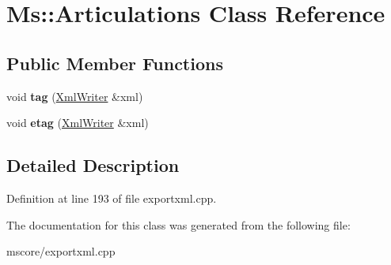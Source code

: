 \hypertarget{class_ms_1_1_articulations}{}\section{Ms\+:\+:Articulations Class Reference}
\label{class_ms_1_1_articulations}
\subsection*{Public Member Functions}
\begin{DoxyCompactItemize}
\item 
\mbox{\label{class_ms_1_1_articulations_aac575fc24d475e5c6cd4b48ddeca65a4}} 
void {\bfseries tag} (\hyperlink{class_ms_1_1_xml_writer}{Xml\+Writer} \&xml)
\item 
\mbox{\label{class_ms_1_1_articulations_a271129dcdc4b267b769b39e15f0754f8}} 
void {\bfseries etag} (\hyperlink{class_ms_1_1_xml_writer}{Xml\+Writer} \&xml)
\end{DoxyCompactItemize}


\subsection{Detailed Description}


Definition at line 193 of file exportxml.\+cpp.



The documentation for this class was generated from the following file\+:\begin{DoxyCompactItemize}
\item 
mscore/exportxml.\+cpp\end{DoxyCompactItemize}
